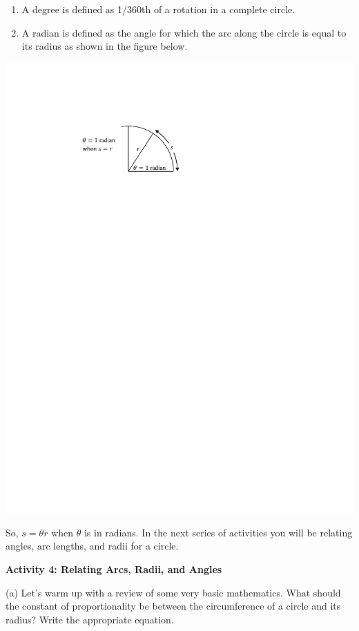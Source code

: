 \begin{enumerate}
\item A degree is defined as 1/360th of a rotation in a complete circle.
\pagebreak[2]
\item A radian is defined as the angle for which the arc along the circle is equal to its radius as shown in the figure below.
\end{enumerate}
\vspace{0.3cm}
{\par\centering \includegraphics{rotation/one_radian.pdf} \par}
\vspace{0.3cm}

So, \(s = \theta r \) when \( \theta \) is in radians. \hfill \break
In the next series of activities you will be relating angles, arc lengths, and
radii for a circle.


\textbf{Activity 4: Relating Arcs, Radii, and Angles} 

(a) Let's warm up with a review of some very basic mathematics. What should
the constant of proportionality be between the circumference of a circle and
its radius? Write the appropriate equation.
\answerspace{10mm}

